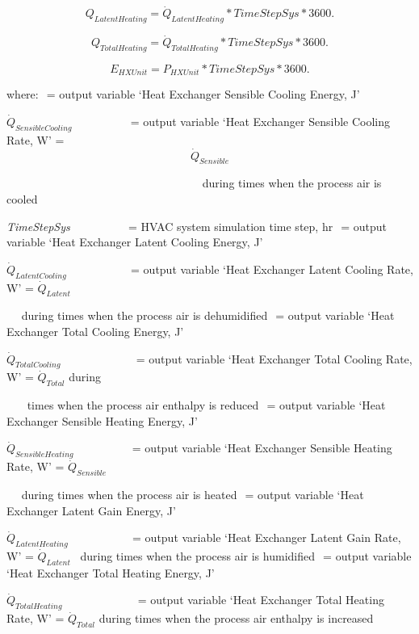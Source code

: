 \begin{equation}
{Q_{LatentHeating}} = {\dot Q_{LatentHeating}}*TimeStepSys*3600.
\end{equation}

\begin{equation}
{Q_{TotalHeating}} = {\dot Q_{TotalHeating}}*TimeStepSys*3600.
\end{equation}

\begin{equation}
{E_{HXUnit}} = {P_{HXUnit}}*TimeStepSys*3600.
\end{equation}

where: \(_{ }\) = output variable `Heat Exchanger Sensible Cooling Energy, J'

\({\dot Q_{SensibleCooling}}\) ~~~~~~~~~ = output variable `Heat Exchanger Sensible Cooling Rate, W' = \[{\dot Q_{Sensible}}\]

~~~~~~~~~~~~~~~~~~~~~~~~~~~~~~~~~~ during times when the process air is cooled

\emph{TimeStepSys} ~~~~~~~~~ = HVAC system simulation time step, hr \(_{ }\) = output variable `Heat Exchanger Latent Cooling Energy, J'

\({\dot Q_{LatentCooling}}\) ~~~~~~~~~~ = output variable `Heat Exchanger Latent Cooling Rate, W' = \({\dot Q_{Latent}}\)

~~ during times when the process air is dehumidified \(_{ }\) = output variable `Heat Exchanger Total Cooling Energy, J'

\({\dot Q_{TotalCooling}}\) ~~~~~~~~~~~~ = output variable `Heat Exchanger Total Cooling Rate, W' = \({\dot Q_{Total}}\) during

~~~ times when the process air enthalpy is reduced \(_{ }\) = output variable `Heat Exchanger Sensible Heating Energy, J'

\({\dot Q_{SensibleHeating}}\) ~~~~~~~~~ = output variable `Heat Exchanger Sensible Heating Rate, W' = \({\dot Q_{Sensible}}\)

~~ during times when the process air is heated \(_{ }\) = output variable `Heat Exchanger Latent Gain Energy, J'

\({\dot Q_{LatentHeating}}\) ~~~~~~~~~~ = output variable `Heat Exchanger Latent Gain Rate, W' = \({\dot Q_{Latent}}\) ~during times when the process air is humidified \(_{ }\) = output variable `Heat Exchanger Total Heating Energy, J'

\({\dot Q_{TotalHeating}}\) ~~~~~~~~~~~~ = output variable `Heat Exchanger Total Heating Rate, W' = \({\dot Q_{Total}}\) during times when the process air enthalpy is increased

